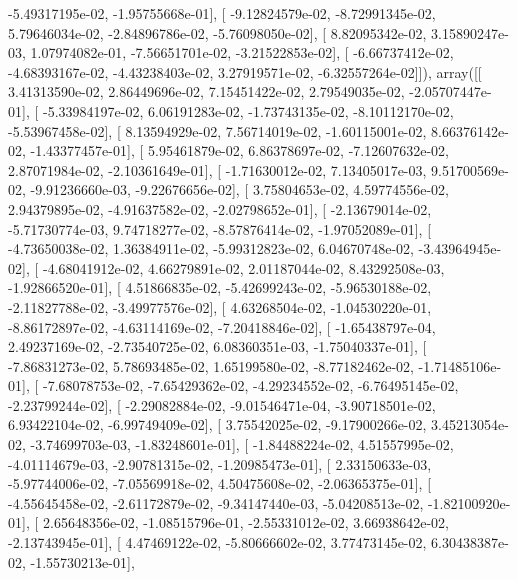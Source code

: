 \documentclass{article}
\begin{document}
         -5.49317195e-02,  -1.95755668e-01],
       [ -9.12824579e-02,  -8.72991345e-02,   5.79646034e-02,
         -2.84896786e-02,  -5.76098050e-02],
       [  8.82095342e-02,   3.15890247e-03,   1.07974082e-01,
         -7.56651701e-02,  -3.21522853e-02],
       [ -6.66737412e-02,  -4.68393167e-02,  -4.43238403e-02,
          3.27919571e-02,  -6.32557264e-02]]), array([[  3.41313590e-02,   2.86449696e-02,   7.15451422e-02,
          2.79549035e-02,  -2.05707447e-01],
       [ -5.33984197e-02,   6.06191283e-02,  -1.73743135e-02,
         -8.10112170e-02,  -5.53967458e-02],
       [  8.13594929e-02,   7.56714019e-02,  -1.60115001e-02,
          8.66376142e-02,  -1.43377457e-01],
       [  5.95461879e-02,   6.86378697e-02,  -7.12607632e-02,
          2.87071984e-02,  -2.10361649e-01],
       [ -1.71630012e-02,   7.13405017e-03,   9.51700569e-02,
         -9.91236660e-03,  -9.22676656e-02],
       [  3.75804653e-02,   4.59774556e-02,   2.94379895e-02,
         -4.91637582e-02,  -2.02798652e-01],
       [ -2.13679014e-02,  -5.71730774e-03,   9.74718277e-02,
         -8.57876414e-02,  -1.97052089e-01],
       [ -4.73650038e-02,   1.36384911e-02,  -5.99312823e-02,
          6.04670748e-02,  -3.43964945e-02],
       [ -4.68041912e-02,   4.66279891e-02,   2.01187044e-02,
          8.43292508e-03,  -1.92866520e-01],
       [  4.51866835e-02,  -5.42699243e-02,  -5.96530188e-02,
         -2.11827788e-02,  -3.49977576e-02],
       [  4.63268504e-02,  -1.04530220e-01,  -8.86172897e-02,
         -4.63114169e-02,  -7.20418846e-02],
       [ -1.65438797e-04,   2.49237169e-02,  -2.73540725e-02,
          6.08360351e-03,  -1.75040337e-01],
       [ -7.86831273e-02,   5.78693485e-02,   1.65199580e-02,
         -8.77182462e-02,  -1.71485106e-01],
       [ -7.68078753e-02,  -7.65429362e-02,  -4.29234552e-02,
         -6.76495145e-02,  -2.23799244e-02],
       [ -2.29082884e-02,  -9.01546471e-04,  -3.90718501e-02,
          6.93422104e-02,  -6.99749409e-02],
       [  3.75542025e-02,  -9.17900266e-02,   3.45213054e-02,
         -3.74699703e-03,  -1.83248601e-01],
       [ -1.84488224e-02,   4.51557995e-02,  -4.01114679e-03,
         -2.90781315e-02,  -1.20985473e-01],
       [  2.33150633e-03,  -5.97744006e-02,  -7.05569918e-02,
          4.50475608e-02,  -2.06365375e-01],
       [ -4.55645458e-02,  -2.61172879e-02,  -9.34147440e-03,
         -5.04208513e-02,  -1.82100920e-01],
       [  2.65648356e-02,  -1.08515796e-01,  -2.55331012e-02,
          3.66938642e-02,  -2.13743945e-01],
       [  4.47469122e-02,  -5.80666602e-02,   3.77473145e-02,
          6.30438387e-02,  -1.55730213e-01],
\end{document}
